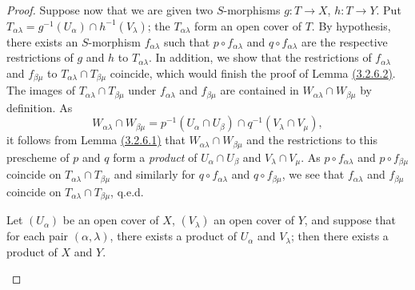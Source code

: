 \begin{proof}
Suppose now that we are given two $S$-morphisms $g:T\to X$, $h:T\to Y$. Put
$T_{\alpha\lambda}=g^{-1}(U_\alpha)\cap h^{-1}(V_\lambda)$; the $T_{\alpha\lambda}$ form an
open cover of $T$. By hypothesis, there exists an $S$-morphism $f_{\alpha\lambda}$ such that
$p\circ f_{\alpha\lambda}$ and $q\circ f_{\alpha\lambda}$ are the respective restrictions of
$g$ and $h$ to $T_{\alpha\lambda}$. In addition, we show that the restrictions of
$f_{\alpha\lambda}$ and $f_{\beta\mu}$ to $T_{\alpha\lambda}\cap T_{\beta\mu}$ coincide,
which would finish the proof of Lemma \hyperref[lem-1.3.2.6.2]{(3.2.6.2)}. The images of
$T_{\alpha\lambda}\cap T_{\beta\mu}$ under $f_{\alpha\lambda}$ and $f_{\beta\mu}$ are
contained in $W_{\alpha\lambda}\cap W_{\beta\mu}$ by definition. As
\[
  W_{\alpha\lambda}\cap W_{\beta\mu}
  =p^{-1}(U_\alpha\cap U_\beta)\cap q^{-1}(V_\lambda\cap V_\mu),
\]
it follows from Lemma \hyperref[lem-1.3.2.6.1]{(3.2.6.1)} that $W_{\alpha\lambda}\cap W_{\beta\mu}$ and the
restrictions to this prescheme of $p$ and $q$ form a {\it product} of $U_\alpha\cap U_\beta$
and $V_\lambda\cap V_\mu$. As $p\circ f_{\alpha\lambda}$ and $p\circ f_{\beta\mu}$ coincide
on $T_{\alpha\lambda}\cap T_{\beta\mu}$ and similarly for $q\circ f_{\alpha\lambda}$ and
$q\circ f_{\beta\mu}$, we see that $f_{\alpha\lambda}$ and $f_{\beta\mu}$ coincide on
$T_{\alpha\lambda}\cap T_{\beta\mu}$, q.e.d.

\begin{lem}[3.2.6.3]
\label{lem-1.3.2.6.3}
Let $(U_\alpha)$ be an open cover of $X$, $(V_\lambda)$ an open cover of $Y$, and suppose
that for each pair $(\alpha,\lambda)$, there exists a product of $U_\alpha$ and $V_\lambda$;
then there exists a product of $X$ and $Y$.
\end{lem}


\end{proof}
